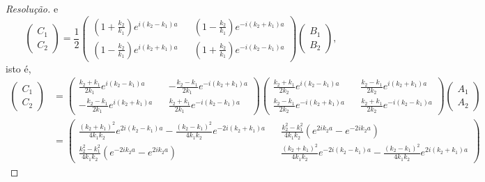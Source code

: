 \begin{proof}[Resolução]
    e
    \begin{equation*}
        \begin{pmatrix}
            C_1\\
            C_2
        \end{pmatrix} = \frac12
        \begin{pmatrix}
            \left(1 + \frac{k_2}{k_1}\right)e^{i(k_2 - k_1)a} &&
            \left(1 - \frac{k_2}{k_1}\right)e^{-i(k_2 + k_1)a} \\
            \left(1 - \frac{k_2}{k_1}\right)e^{i(k_2 + k_1)a} &&
            \left(1 + \frac{k_2}{k_1}\right)e^{-i(k_2 - k_1)a}
        \end{pmatrix}
        \begin{pmatrix}
            B_1\\
            B_2
        \end{pmatrix},
    \end{equation*}
    isto é,
    \begin{align*}
        \begin{pmatrix}
            C_1\\
            C_2
        \end{pmatrix} &=
        \begin{pmatrix}
            \frac{k_2 + k_1}{2k_1}e^{i(k_2 - k_1)a} &&
            -\frac{k_2-k_1}{2k_1}e^{-i(k_2 + k_1)a} \\
            - \frac{k_2-k_1}{2k_1}e^{i(k_2 + k_1)a} &&
            \frac{k_2 + k_1}{2k_1}e^{-i(k_2 - k_1)a}
        \end{pmatrix}
        \begin{pmatrix}
            \frac{k_2 + k_1}{2k_2}e^{i(k_2 - k_1)a} &&
            \frac{k_2 - k_1}{2k_2}e^{i(k_2 + k_1)a} \\
            \frac{k_2 - k_1}{2k_2}e^{-i(k_2 + k_1)a} &&
            \frac{k_2 + k_1}{2k_2}e^{-i(k_2 - k_1)a}
        \end{pmatrix}
        \begin{pmatrix}
            A_1\\
            A_2
        \end{pmatrix}\\
        &= \begin{pmatrix}
            \frac{(k_2 + k_1)^2}{4k_1k_2} e^{2i(k_2 - k_1)a} - \frac{(k_2 - k_1)^2}{4k_1k_2} e^{-2i(k_2 + k_1)a} && \frac{k_2^2 - k_1^2}{4k_1k_2} (e^{2i k_2 a} - e^{-2i k_2 a})\\
            \frac{k_2^2 - k_1^2}{4k_1k_2}(e^{-2ik_2a} - e^{2ik_2a}) && \frac{(k_2 + k_1)^2}{4k_1k_2} e^{-2i(k_2 - k_1)a} - \frac{(k_2 - k_1)^2}{4k_1k_2} e^{2i(k_2 + k_1)a}

\end{pmatrix}
\end{align*}
\end{proof}
